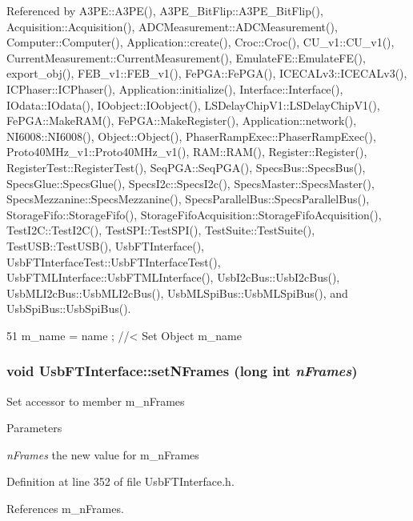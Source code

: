 Referenced by A3PE::A3PE(), A3PE\_\-BitFlip::A3PE\_\-BitFlip(), Acquisition::Acquisition(), ADCMeasurement::ADCMeasurement(), Computer::Computer(), Application::create(), Croc::Croc(), CU\_\-v1::CU\_\-v1(), CurrentMeasurement::CurrentMeasurement(), EmulateFE::EmulateFE(), export\_\-obj(), FEB\_\-v1::FEB\_\-v1(), FePGA::FePGA(), ICECALv3::ICECALv3(), ICPhaser::ICPhaser(), Application::initialize(), Interface::Interface(), IOdata::IOdata(), IOobject::IOobject(), LSDelayChipV1::LSDelayChipV1(), FePGA::MakeRAM(), FePGA::MakeRegister(), Application::network(), NI6008::NI6008(), Object::Object(), PhaserRampExec::PhaserRampExec(), Proto40MHz\_\-v1::Proto40MHz\_\-v1(), RAM::RAM(), Register::Register(), RegisterTest::RegisterTest(), SeqPGA::SeqPGA(), SpecsBus::SpecsBus(), SpecsGlue::SpecsGlue(), SpecsI2c::SpecsI2c(), SpecsMaster::SpecsMaster(), SpecsMezzanine::SpecsMezzanine(), SpecsParallelBus::SpecsParallelBus(), StorageFifo::StorageFifo(), StorageFifoAcquisition::StorageFifoAcquisition(), TestI2C::TestI2C(), TestSPI::TestSPI(), TestSuite::TestSuite(), TestUSB::TestUSB(), UsbFTInterface(), UsbFTInterfaceTest::UsbFTInterfaceTest(), UsbFTMLInterface::UsbFTMLInterface(), UsbI2cBus::UsbI2cBus(), UsbMLI2cBus::UsbMLI2cBus(), UsbMLSpiBus::UsbMLSpiBus(), and UsbSpiBus::UsbSpiBus().


\begin{DoxyCode}
51 { m_name  = name  ; } //< Set Object m_name
\end{DoxyCode}
\hypertarget{classUsbFTInterface_a247a19741032fa0f330cc3f6c17ed08b}{
\subsubsection[{setNFrames}]{\setlength{\rightskip}{0pt plus 5cm}void UsbFTInterface::setNFrames (long int {\em nFrames})}}
\label{classUsbFTInterface_a247a19741032fa0f330cc3f6c17ed08b}
Set accessor to member m\_\-nFrames 
\begin{DoxyParams}{Parameters}
\item[{\em nFrames}]the new value for m\_\-nFrames \end{DoxyParams}


Definition at line 352 of file UsbFTInterface.h.

References m\_\-nFrames.


